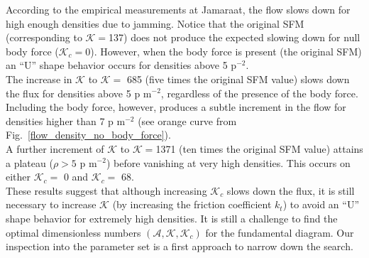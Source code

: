 \documentclass[preprint,12pt]{elsarticle}
\begin{document}
According to the empirical measurements at Jamaraat, the flow slows down for
high enough densities due to jamming. Notice that the original SFM
(corresponding to $\mathcal{K}=$137) does not produce the expected slowing down
for null body force ($\mathcal{K}_c=$0). However, when the body force is present
(the original SFM) an ``U'' shape behavior occurs for densities above 5
p$^{-2}$.\\

The increase in $\mathcal{K}$ to $\mathcal{K} = $ 685 (five times the original
SFM value) slows down  the flux for densities above 5 p m$^{-2}$, regardless of
the presence of the body force. Including the body force, however, produces a
subtle increment in the flow for densities higher than 7 p m$^{-2}$ (see orange
curve from Fig.~\ref{flow_density_no_body_force}). \\

A further increment of $\mathcal{K}$ to $\mathcal{K}=$1371 (ten times the 
original SFM value) attains a plateau ($\rho>5$ p m$^{-2}$) before vanishing at 
very high densities. This occurs on either $\mathcal{K}_c=$ 0 and 
$\mathcal{K}_c = $ 68.\\


These results suggest that although increasing $\mathcal{K}_c$ slows down the
flux, it is still necessary to increase $\mathcal{K}$ (by increasing the
friction coefficient $k_t$) to avoid an ``U'' shape behavior for extremely high
densities. It is still a challenge to find the optimal dimensionless numbers
$(\mathcal{A},\mathcal{K},\mathcal{K}_c)$ for the fundamental diagram. Our
inspection into the parameter set is a first approach to narrow down the
search.\\
\end{document}

